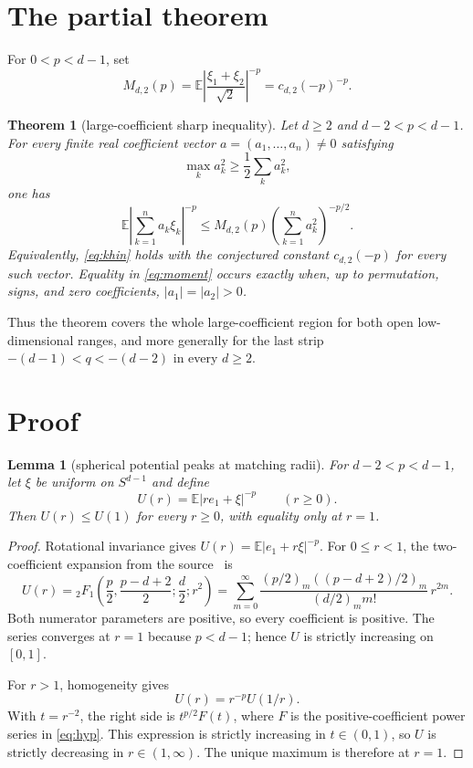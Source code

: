 \documentclass[11pt]{article}
\newtheorem{theorem}{Theorem}
\newtheorem{lemma}{Lemma}
\newcommand{\E}{\mathbb E}
\begin{document}
\section{The partial theorem}

For $0<p<d-1$, set
\[
 M_{d,2}(p)=\E\left|\frac{\xi_1+\xi_2}{\sqrt2}\right|^{-p}
 =c_{d,2}(-p)^{-p}.
\]

\begin{theorem}[large-coefficient sharp inequality]\label{thm:main}
Let $d\geq2$ and $d-2<p<d-1$.  For every finite real coefficient vector
$a=(a_1,\ldots,a_n)\ne0$ satisfying
\begin{equation}\label{eq:large}
 \max_k a_k^2\geq\frac12\sum_k a_k^2,
\end{equation}
one has
\begin{equation}\label{eq:moment}
 \E\left|\sum_{k=1}^n a_k\xi_k\right|^{-p}
 \leq M_{d,2}(p)\left(\sum_{k=1}^n a_k^2\right)^{-p/2}.
\end{equation}
Equivalently, \eqref{eq:khin} holds with the conjectured constant
$c_{d,2}(-p)$ for every such vector.  Equality in \eqref{eq:moment} occurs
exactly when, up to permutation, signs, and zero coefficients,
$|a_1|=|a_2|>0$.
\end{theorem}

Thus the theorem covers the whole large-coefficient region for both open
low-dimensional ranges, and more generally for the last strip
$-(d-1)<q<-(d-2)$ in every $d\geq2$.

\section{Proof}

\begin{lemma}[spherical potential peaks at matching radii]\label{lem:peak}
For $d-2<p<d-1$, let $\xi$ be uniform on $S^{d-1}$ and define
\[
 U(r)=\E|r e_1+\xi|^{-p}\qquad(r\geq0).
\]
Then $U(r)\leq U(1)$ for every $r\geq0$, with equality only at $r=1$.
\end{lemma}

\begin{proof}
Rotational invariance gives
$U(r)=\E|e_1+r\xi|^{-p}$.  For $0\leq r<1$, the two-coefficient expansion
from the source~\cite[Lemma 13]{CST} is
\begin{equation}\label{eq:hyp}
 U(r)={}_2F_1\left(\frac p2,\frac{p-d+2}{2};\frac d2;r^2\right)
 =\sum_{m=0}^{\infty}
 \frac{(p/2)_m((p-d+2)/2)_m}{(d/2)_m m!}\,r^{2m}.
\end{equation}
Both numerator parameters are positive, so every coefficient is positive.
The series converges at $r=1$ because $p<d-1$; hence $U$ is strictly
increasing on $[0,1]$.

For $r>1$, homogeneity gives
\[
 U(r)=r^{-p}U(1/r).
\]
With $t=r^{-2}$, the right side is $t^{p/2}F(t)$, where $F$ is the
positive-coefficient power series in \eqref{eq:hyp}.  This expression is
strictly increasing in $t\in(0,1)$, so $U$ is strictly decreasing in
$r\in(1,\infty)$.  The unique maximum is therefore at $r=1$.
\end{proof}
\end{document}
